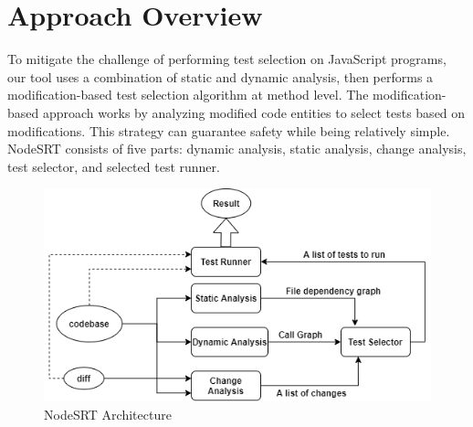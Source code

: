 \documentclass[10pt, conference]{IEEEtran}
\begin{document}
\section{Approach Overview}
To mitigate the challenge of performing test selection on JavaScript programs, our tool uses a combination of static and dynamic analysis, then performs a modification-based test 
selection algorithm at method level. The modification-based approach works by analyzing modified code entities 
to select tests based on modifications. This strategy can guarantee safety while being relatively simple. NodeSRT consists of five parts: dynamic analysis, static analysis, change analysis, 
test selector, and selected test runner. 
\begin{figure}[htbp]
    \centerline{\includegraphics[scale=0.45]{NodeSRTArchitecture.png}}
    \caption{NodeSRT Architecture}
    \label{fig}
    \end{figure}    
\end{document}
